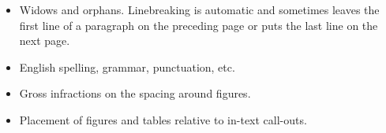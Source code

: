 \begin{singlespace}
\begin{itemize}
\begin{itemize}
		\item	Widows and orphans.
		Linebreaking is automatic and sometimes leaves the first line of a paragraph on the preceding page or puts the last line on the next page.
		
		\item English spelling, grammar, punctuation, etc.
		
		\item Gross infractions on the spacing around figures.
		
		\item Placement of figures and tables relative to in-text call-outs.
	\end{itemize}

\end{itemize}

\end{singlespace}


\clearpage
